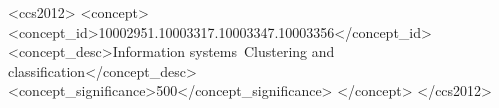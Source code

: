 \documentclass[sigconf]{acmart}
\begin{document}


\renewcommand{\shortauthors}{Jialei Li et al.}



\begin{CCSXML}
<ccs2012>
   <concept>
       <concept_id>10002951.10003317.10003347.10003356</concept_id>
       <concept_desc>Information systems~Clustering and classification</concept_desc>
       <concept_significance>500</concept_significance>
       </concept>
 </ccs2012>
\end{CCSXML}







\maketitle









\balance



\end{document}
